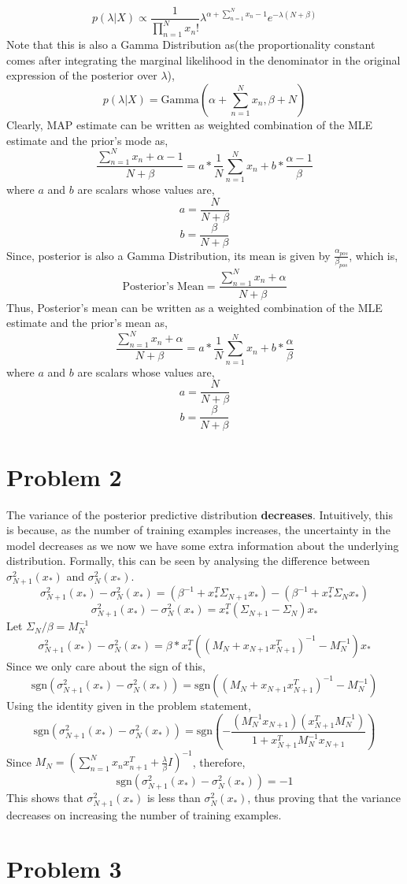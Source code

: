 \documentclass{article}
\begin{document}
$$p(\lambda|X) \propto  \frac{1}{\prod_{n=1}^{N}x_n!} \lambda^{\alpha + \sum_{n=1}^Nx_n -1}e^{-\lambda(N+\beta)}$$
Note that this is also a Gamma Distribution as(the proportionality constant comes after integrating the marginal likelihood in the denominator in the original expression of the posterior over $\lambda$), 
$$p(\lambda|X) = \text{Gamma}(\alpha + \sum_{n=1}^Nx_n, \beta + N)$$
Clearly, MAP estimate can be written as weighted combination of the MLE estimate and the prior's mode as,
$$\frac{\sum_{n=1}^Nx_n + \alpha-1}{N+\beta} = a*\frac{1}{N}\sum_{n=1}^Nx_n + b*\frac{\alpha-1}{\beta}$$
where $a$ and $b$ are scalars whose values are,
$$a = \frac{N}{N+\beta}$$
$$b = \frac{\beta}{N+\beta}$$
Since, posterior is also a Gamma Distribution, its mean is given by $\frac{\alpha_{pos}}{\beta_{pos}}$, which is,
$$\text{Posterior's Mean} = \frac{\sum_{n=1}^{N}x_n+ \alpha}{N+\beta}$$ 
Thus, Posterior's mean can be written as a weighted combination of the MLE estimate and the prior's mean as,
$$\frac{\sum_{n=1}^Nx_n + \alpha}{N+\beta} = a*\frac{1}{N}\sum_{n=1}^Nx_n + b*\frac{\alpha}{\beta}$$
where $a$ and $b$ are scalars whose values are,
$$a = \frac{N}{N+\beta}$$
$$b = \frac{\beta}{N+\beta}$$
\section*{Problem 2}
The variance of the posterior predictive distribution \textbf{decreases}. Intuitively, this is because, as the number of training examples increases, the uncertainty in the model decreases as we now we have some extra information about the underlying distribution. Formally, this can be seen by analysing the difference between $\sigma^2_{N+1}(x_*)$ and $\sigma^2_{N}(x_*)$.
$$\sigma^2_{N+1}(x_*) - \sigma^2_{N}(x_*) = (\beta^{-1} + x_*^{T}\Sigma_{N+1}x_*) - (\beta^{-1} + x_*^{T}\Sigma_{N}x_*)$$
$$\sigma^2_{N+1}(x_*) - \sigma^2_{N}(x_*) = x_*^{T}(\Sigma_{N+1} - \Sigma_N)x_* $$
Let $\Sigma_N/\beta = M_N^{-1}$ 
$$\sigma^2_{N+1}(x_*) - \sigma^2_{N}(x_*) = \beta*x_*^{T}((M_{N}+x_{N+1}x_{N+1}^T)^{-1} - M_N^{-1})x_* $$
Since we only care about the sign of this,
$$\text{sgn}(\sigma^2_{N+1}(x_*) - \sigma^2_{N}(x_*)) = \text{sgn}((M_{N}+x_{N+1}x_{N+1}^T)^{-1} - M_N^{-1}) $$
Using the identity given in the problem statement, 
$$\text{sgn}(\sigma^2_{N+1}(x_*) - \sigma^2_{N}(x_*)) = \text{sgn}(-\frac{(M_N^{-1}x_{N+1})(x_{N+1}^{T} M_N^{-1})}{1+x_{N+1}^TM_N^{-1}x_{N+1}}) $$
Since $M_N = (\sum_{n=1}^{N}x_nx_{n+1}^T + \frac{\lambda}{\beta
}I)^{-1}$, therefore, 
$$\text{sgn}(\sigma^2_{N+1}(x_*) - \sigma^2_{N}(x_*)) = -1 $$
This shows that $\sigma^2_{N+1}(x_*)$ is less than $\sigma^2_{N}(x_*)$, thus proving that the variance decreases on increasing the number of training examples.

\section*{Problem 3}
\end{document}
